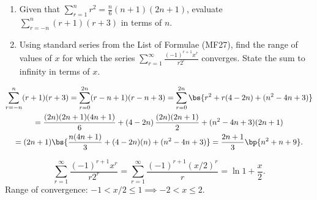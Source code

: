 \begin{problem}
    \begin{enumerate}
        \item Given that $\sum_{r=1}^n r^2 = \frac{n}6 (n+1)(2n+1)$, evaluate $\sum_{r=-n}^n (r+1)(r+3)$ in terms of $n$.
        \item Using standard series from the List of Formulae (MF27), find the range of values of $x$ for which the series $\sum_{r=1}^\infty \frac{(-1)^{r+1} x^r}{r 2^r}$ converges. State the sum to infinity in terms of $x$.
    \end{enumerate}
\end{problem}
\begin{solution}
    \begin{ppart}
        \begin{gather*}
            \sum_{r=-n}^n (r+1)(r+3) = \sum_{r=0}^{2n} (r-n+1)(r-n+3) = \sum_{r=0}^{2n} \bs{r^2 + r(4-2n) + (n^2 - 4n + 3)}\\
            = \frac{(2n)(2n+1)(4n+1)}{6} + (4-2n) \, \frac{(2n)(2n+1)}2 + (n^2 - 4n + 3) (2n+1)\\
            = (2n+1)\bs{\frac{n(4n+1)}{3} + (4-2n)(n) + (n^2 - 4n + 3)} = \frac{2n+1}{3} \bp{n^2 + n +9}.
        \end{gather*}
    \end{ppart}
    \begin{ppart}
        \[\sum_{r=1}^\infty \frac{(-1)^{r+1} x^r}{r 2^r} = \sum_{r=1}^\infty \frac{(-1)^{r+1} (x/2)^r}{r} = \ln{1 + \frac{x}2}.\] Range of convergence: $-1 < x/2 \leq 1 \implies -2 < x \leq 2$.
    \end{ppart}
\end{solution}

